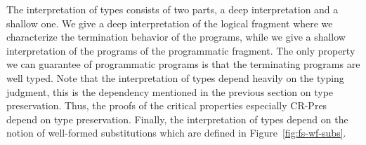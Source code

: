 The interpretation of types consists of two parts, a deep
interpretation and a shallow one.  We give a deep interpretation of
the logical fragment where we characterize the termination behavior of
the programs, while we give a shallow interpretation of the programs
of the programmatic fragment.  The only property we can guarantee of
programmatic programs is that the terminating programs are well typed.
Note that the interpretation of types depend heavily on the typing
judgment, this is the dependency mentioned in the previous section on
type preservation.  Thus, the proofs of the critical properties
especially CR-Pres depend on type preservation.  Finally, the
interpretation of types depend on the notion of well-formed
substitutions which are defined in Figure~\ref{fig:fs-wf-subs}.

